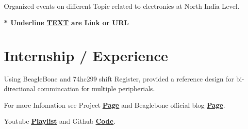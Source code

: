 \documentclass[]{font}
\begin{document}
\begin{minipage}[t]{0.30\textwidth}
\vspace{\topsep} %
\textbullet{}Organized events on different Topic related to electronics at North India Level.
\sectionsep

\textbf{\** Underline \underline{TEXT} are Link or URL}
%
%

\end{minipage} 
\hfill
\begin{minipage}[t]{0.69\textwidth} 


\section{Internship / Experience}
\vspace{\topsep} %

\vspace{\topsep} %
\begin{tightemize}
\item Using BeagleBone and 74hc299 shift Register, provided a reference design for bi-directional commincation for multiple peripherials.
\item For more Infomation see Project \textbf{\href{https://elinux.org/Beagleboard_gsoc_2019_bi-directional_progress}{\underline{Page}}} and Beaglebone official blog \textbf{\href{https://beagleboard.org/blog/2019-06-02-beagleboard-org-community-kicks-off-gsoc-2019-with-four-projects}{\underline{Page}}}.
\item Youtube \textbf{\href{https://www.youtube.com/watch?v=ZZDT6jNslqw&list=PLttoix_9Us2yHM4zNr08ynm4iwXZTgxam}{\underline{Playlist}}} and Github \textbf{\href{https://github.com/pranav083/pocket_beagle-work}{\underline{Code}}}. 
\end{tightemize}
\sectionsep



\end{minipage}
\end{document}
